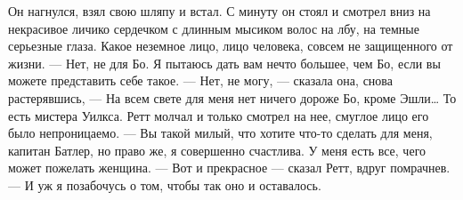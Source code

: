 Он нагнулся, взял свою шляпу и встал. С минуту он стоял и смотрел вниз на некрасивое личико сердечком с длинным мысиком волос на лбу, на темные серьезные глаза. Какое неземное лицо, лицо человека, совсем не защищенного от жизни.
— Нет, не для Бо. Я пытаюсь дать вам нечто большее, чем Бо, если вы можете представить себе такое.
— Нет, не могу, — сказала она, снова растерявшись, — На всем свете для меня нет ничего дороже Бо, кроме Эшли… То есть мистера Уилкса.
Ретт молчал и только смотрел на нее, смуглое лицо его было непроницаемо.
— Вы такой милый, что хотите что-то сделать для меня, капитан Батлер, но право же, я совершенно счастлива. У меня есть все, чего может пожелать женщина.
— Вот и прекрасное — сказал Ретт, вдруг помрачнев. — И уж я позабочусь о том, чтобы так оно и оставалось.




